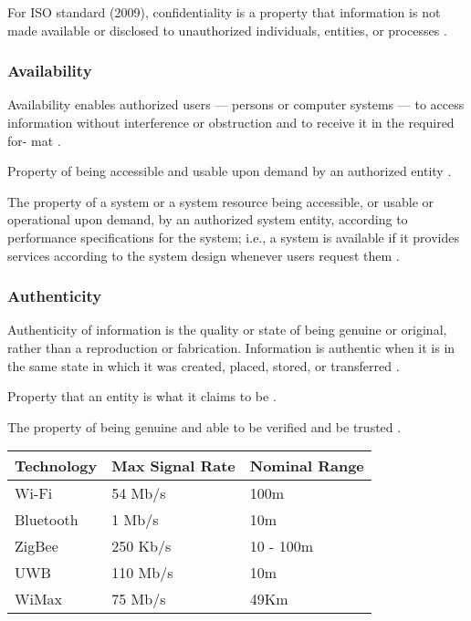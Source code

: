 \documentclass[letterpaper,conference]{IEEEtran}
\begin{document}
For ISO standard (2009), confidentiality is a property that information is not made available or disclosed to 
unauthorized individuals, entities, or processes  \cite{ISO27000}.

\subsubsection{Availability}
Availability enables authorized users — persons or computer systems — to
access information without interference or obstruction and to receive it in the required for-
mat \cite{whitman2011principles}.

Property of being accessible and usable upon demand by an authorized entity \cite{ISO27000}.

The property of a system or a system resource being accessible, or usable or operational 
upon demand, by an authorized system entity, according to performance specifications for the 
system; i.e., a system is available if it provides services according to the system design 
whenever users request them \cite{shirey2007internet}.

\subsubsection{Authenticity}
Authenticity of information is the quality or state of being genuine or original, rather than a reproduction 
or fabrication. Information is authentic when it is in the same state in which it was created, placed, 
stored, or transferred \cite{whitman2011principles}.

Property that an entity is what it claims to be \cite{ISO27000}.

The property of being genuine and able to be verified and be trusted \cite{shirey2007internet}.

\cite{ferro2005bluetooth} \cite{lee2007comparative} \cite{vaughan2004achieving}
\begin{table}[htb]
\begin{tabular}{lll}
\hline
Technology  & Max Signal Rate & Nominal Range \\ \hline
Wi-Fi       & 54 Mb/s         & 100m          \\
Bluetooth   & 1 Mb/s          & 10m           \\
ZigBee      & 250 Kb/s        & 10 - 100m     \\
UWB         & 110 Mb/s        & 10m           \\
WiMax       & 75 Mb/s         & 49Km          \\ \hline
\end{tabular}
\end{table}
\end{document}

